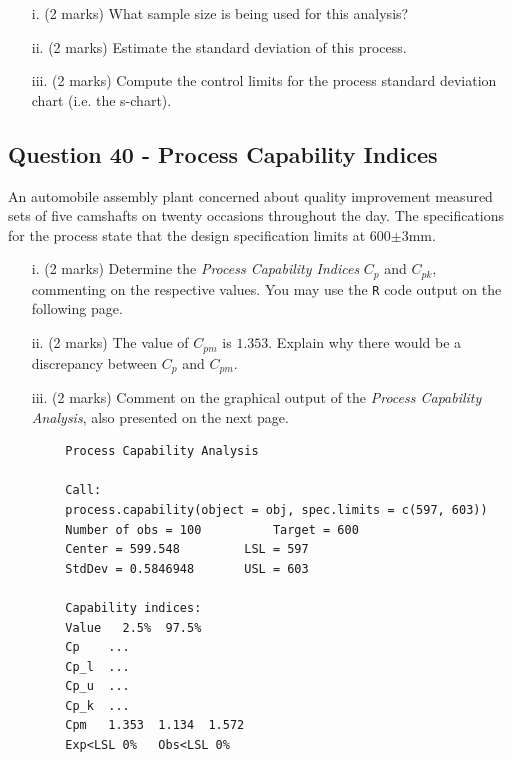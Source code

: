 \documentclass[a4paper,12pt]{article}
\begin{document}
	\begin{itemize}
		\item[i.] (2 marks) What sample size is being used for this analysis?
		\item[ii.] (2 marks) Estimate the standard deviation of this process.
		\item[iii.] (2 marks) Compute the control limits for the process standard deviation chart (i.e. the s-chart).
	\end{itemize}
	
\subsection*{Question 40 - Process Capability Indices}

An automobile assembly plant concerned about quality improvement measured sets of five camshafts on twenty occasions throughout the day. The specifications for the process state that the design specification limits at 600$\pm$3mm.
	
	
	\begin{itemize}
		\item[i.] (2 marks) Determine the \emph{Process Capability Indices} $C_p$ and $C_{pk}$, commenting on the respective values. You may use the \texttt{R} code output on the following page.
		\item[ii.] (2 marks)  The value of $C_{pm}$ is $1.353$. Explain why there would be a discrepancy between $C_p$ and $C_{pm}$.
		\item[iii.] (2 marks) Comment on the graphical output of the \emph{Process Capability Analysis}, also presented on the next page.
	\end{itemize}
	
	
	\newpage
	\begin{framed}
		\begin{verbatim}
		Process Capability Analysis
		
		Call:
		process.capability(object = obj, spec.limits = c(597, 603))
		Number of obs = 100          Target = 600
		Center = 599.548         LSL = 597
		StdDev = 0.5846948       USL = 603
		
		Capability indices:
		Value   2.5%  97.5%
		Cp    ...
		Cp_l  ...
		Cp_u  ...
		Cp_k  ...
		Cpm   1.353  1.134  1.572
		Exp<LSL 0%   Obs<LSL 0%
		\end{verbatim}
	\end{framed}
	
	
	
\end{document}
